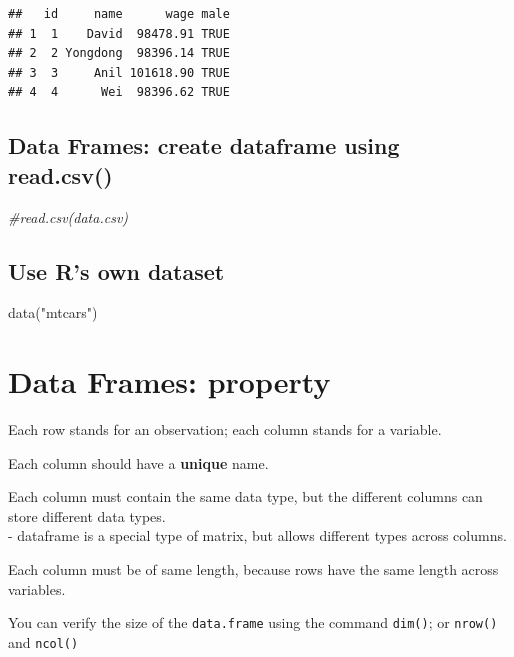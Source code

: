 \documentclass[
  11pt,
]{book}
\newenvironment{Shaded}{\begin{snugshade}}{\end{snugshade}}
\newcommand{\CommentTok}[1]{\textcolor[rgb]{0.56,0.35,0.01}{\textit{#1}}}
\newcommand{\FunctionTok}[1]{\textcolor[rgb]{0.00,0.00,0.00}{#1}}
\newcommand{\NormalTok}[1]{#1}
\newcommand{\StringTok}[1]{\textcolor[rgb]{0.31,0.60,0.02}{#1}}
\begin{document}
\begin{verbatim}
##   id     name      wage male
## 1  1    David  98478.91 TRUE
## 2  2 Yongdong  98396.14 TRUE
## 3  3     Anil 101618.90 TRUE
## 4  4      Wei  98396.62 TRUE
\end{verbatim}

\hypertarget{data-frames-create-dataframe-using-read.csv}{%
\subsection{Data Frames: create dataframe using read.csv()}\label{data-frames-create-dataframe-using-read.csv}}

\begin{Shaded}
\begin{Highlighting}[]
\CommentTok{\#read.csv(\textquotesingle{}data.csv\textquotesingle{})}
\end{Highlighting}
\end{Shaded}

\hypertarget{use-rs-own-dataset}{%
\subsection{Use R's own dataset}\label{use-rs-own-dataset}}

\begin{Shaded}
\begin{Highlighting}[]
\FunctionTok{data}\NormalTok{(}\StringTok{"mtcars"}\NormalTok{)}
\end{Highlighting}
\end{Shaded}

\hypertarget{data-frames-property}{%
\section{Data Frames: property}\label{data-frames-property}}

Each row stands for an observation; each column stands for a variable.

Each column should have a \textbf{unique} name.

Each column must contain the same data type, but the different columns can store different data types.\\
- dataframe is a special type of matrix, but allows different types across columns.

Each column must be of same length, because rows have the same length across variables.

You can verify the size of the \texttt{data.frame} using the command \texttt{dim()}; or \texttt{nrow()} and \texttt{ncol()}
\end{document}
